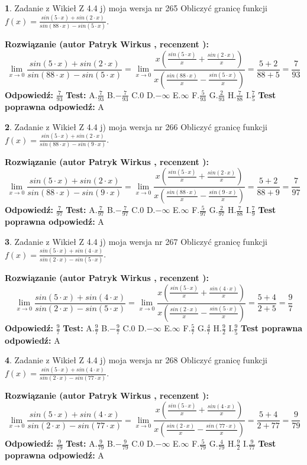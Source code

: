 \documentclass[12pt, a4paper]{article}
\theoremstyle{definition} %
\newtheorem{zad}{}
\newcommand{\zadStart}[1]{\begin{zad}#1\newline}
\newcommand{\zadStop}{\end{zad}}
\newcommand{\rozwStart}[2]{\noindent \textbf{Rozwiązanie (autor #1 , recenzent #2): }\newline}
\newcommand{\rozwStop}{\newline}
\newcommand{\odpStart}{\noindent \textbf{Odpowiedź:}\newline}
\newcommand{\odpStop}{\newline}
\newcommand{\testStart}{\noindent \textbf{Test:}\newline}
\newcommand{\testStop}{\newline}
\newcommand{\kluczStart}{\noindent \textbf{Test poprawna odpowiedź:}\newline}
\newcommand{\kluczStop}{\newline}
\begin{document}
\zadStart{Zadanie z Wikieł Z 4.4 j) moja wersja nr 265}
Obliczyć granicę funkcji $f(x)=\frac{sin(5\cdot x) +sin(2\cdot x)}{sin(88\cdot x) -sin(5\cdot x)}$.
\zadStop
\rozwStart{Patryk Wirkus}{}
$$\lim\limits_{x\to 0}\frac{sin(5\cdot x) +sin(2\cdot x)}{sin(88\cdot x) -sin(5\cdot x)}=\lim\limits_{x\to 0}\frac{x(\frac{sin(5\cdot x)}{x}+\frac{sin(2\cdot x)}{x})}{x(\frac{sin(88\cdot x)}{x}-\frac{sin(5\cdot x)}{x})}=\frac{5+2}{88+5} = \frac{7}{93}$$
\rozwStop
\odpStart
$\frac{7}{93}$
\odpStop
\testStart
A.$\frac{7}{93}$
B.$-\frac{7}{93}$
C.$0$
D.$-\infty$
E.$\infty$
F.$\frac{5}{93}$
G.$\frac{2}{93}$
H.$\frac{7}{88}$
I.$\frac{7}{5}$
\testStop
\kluczStart
A
\kluczStop



\zadStart{Zadanie z Wikieł Z 4.4 j) moja wersja nr 266}
Obliczyć granicę funkcji $f(x)=\frac{sin(5\cdot x) +sin(2\cdot x)}{sin(88\cdot x) -sin(9\cdot x)}$.
\zadStop
\rozwStart{Patryk Wirkus}{}
$$\lim\limits_{x\to 0}\frac{sin(5\cdot x) +sin(2\cdot x)}{sin(88\cdot x) -sin(9\cdot x)}=\lim\limits_{x\to 0}\frac{x(\frac{sin(5\cdot x)}{x}+\frac{sin(2\cdot x)}{x})}{x(\frac{sin(88\cdot x)}{x}-\frac{sin(9\cdot x)}{x})}=\frac{5+2}{88+9} = \frac{7}{97}$$
\rozwStop
\odpStart
$\frac{7}{97}$
\odpStop
\testStart
A.$\frac{7}{97}$
B.$-\frac{7}{97}$
C.$0$
D.$-\infty$
E.$\infty$
F.$\frac{5}{97}$
G.$\frac{2}{97}$
H.$\frac{7}{88}$
I.$\frac{7}{9}$
\testStop
\kluczStart
A
\kluczStop



\zadStart{Zadanie z Wikieł Z 4.4 j) moja wersja nr 267}
Obliczyć granicę funkcji $f(x)=\frac{sin(5\cdot x) +sin(4\cdot x)}{sin(2\cdot x) -sin(5\cdot x)}$.
\zadStop
\rozwStart{Patryk Wirkus}{}
$$\lim\limits_{x\to 0}\frac{sin(5\cdot x) +sin(4\cdot x)}{sin(2\cdot x) -sin(5\cdot x)}=\lim\limits_{x\to 0}\frac{x(\frac{sin(5\cdot x)}{x}+\frac{sin(4\cdot x)}{x})}{x(\frac{sin(2\cdot x)}{x}-\frac{sin(5\cdot x)}{x})}=\frac{5+4}{2+5} = \frac{9}{7}$$
\rozwStop
\odpStart
$\frac{9}{7}$
\odpStop
\testStart
A.$\frac{9}{7}$
B.$-\frac{9}{7}$
C.$0$
D.$-\infty$
E.$\infty$
F.$\frac{5}{7}$
G.$\frac{4}{7}$
H.$\frac{9}{2}$
I.$\frac{9}{5}$
\testStop
\kluczStart
A
\kluczStop



\zadStart{Zadanie z Wikieł Z 4.4 j) moja wersja nr 268}
Obliczyć granicę funkcji $f(x)=\frac{sin(5\cdot x) +sin(4\cdot x)}{sin(2\cdot x) -sin(77\cdot x)}$.
\zadStop
\rozwStart{Patryk Wirkus}{}
$$\lim\limits_{x\to 0}\frac{sin(5\cdot x) +sin(4\cdot x)}{sin(2\cdot x) -sin(77\cdot x)}=\lim\limits_{x\to 0}\frac{x(\frac{sin(5\cdot x)}{x}+\frac{sin(4\cdot x)}{x})}{x(\frac{sin(2\cdot x)}{x}-\frac{sin(77\cdot x)}{x})}=\frac{5+4}{2+77} = \frac{9}{79}$$
\rozwStop
\odpStart
$\frac{9}{79}$
\odpStop
\testStart
A.$\frac{9}{79}$
B.$-\frac{9}{79}$
C.$0$
D.$-\infty$
E.$\infty$
F.$\frac{5}{79}$
G.$\frac{4}{79}$
H.$\frac{9}{2}$
I.$\frac{9}{77}$
\testStop
\kluczStart
A
\kluczStop
\end{document}
